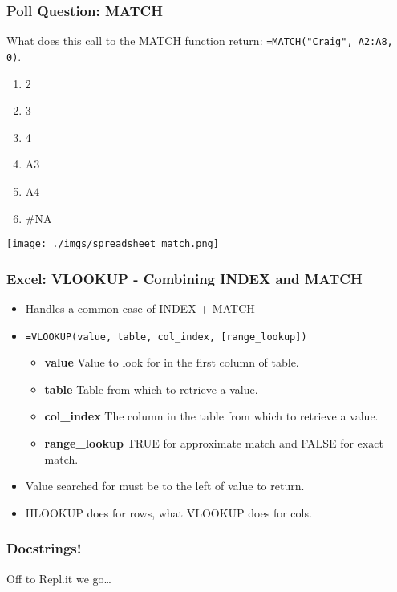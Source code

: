 \documentclass{beamer}
\begin{document}
%
%
\begin{frame}[fragile]
  \frametitle{Poll Question: MATCH}
  What does this call to the MATCH function return: \lstinline|=MATCH("Craig", A2:A8, 0)|.\\
  \vfill
  \begin{minipage}{0.48\textwidth}
    \begin{enumerate}[A]
      \item 2
      \item 3
      \item 4
      \item A3
      \item A4
      \item \#NA
    \end{enumerate}
  \end{minipage}
  \hfill
  \begin{minipage}{0.48\textwidth}
    \texttt{[image: ./imgs/spreadsheet\_match.png]}
  \end{minipage}
\end{frame}


%
%
\begin{frame}[fragile]
  \frametitle{Excel: VLOOKUP - Combining INDEX and MATCH}
  \begin{itemize}
    \item Handles a common case of INDEX + MATCH
    \item \lstinline|=VLOOKUP(value, table, col_index, [range_lookup])|
      \begin{itemize}
        \item \textbf{value} \textrightarrow  Value to look for in the first column of table.
        \item \textbf{table} \textrightarrow  Table from which to retrieve a value.
        \item \textbf{col\_index} \textrightarrow The column in the table from which to retrieve a value.
        \item \textbf{range\_lookup} \textrightarrow TRUE for approximate match and FALSE for exact match.
      \end{itemize}
      \item Value searched for must be to the left of value to return.
      \item HLOOKUP does for rows, what VLOOKUP does for cols.
  \end{itemize}
\end{frame}


%
%
\begin{frame}[fragile]
  \frametitle{Docstrings!}
  \centering
  Off to Repl.it we go\ldots
\end{frame}
\end{document}
